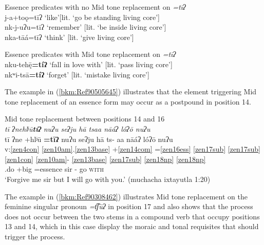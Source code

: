 \documentclass[output=paper]{langscibook}
\begin{document}
\ea\label{bkm:Ref90239685}Essence predicates with no Mid tone replacement on \textit{=tīʔ}\\
j-a+toǫ=tīʔ \hspace{1cm} `like'\hspace{2.2cm}[lit. `go be standing living core']\\
nk-j-uʔu=tīʔ \hspace{0.77cm} `remember'\hspace{1.1cm}  [lit. `be inside living core']\\
nka-tāá=tīʔ \hspace{0.94cm} `think'\hspace{1.84cm}  [lit. `give living core']\\
\z 

\ea\label{bkm:Ref90239700}Essence predicates with Mid tone replacement on \textit{=tīʔ}\\
nku-teh\={ę}\textbf{=tíʔ} \hspace{0.7cm} `fall in love with' \hspace{0.1cm} [lit. `pass living core']\\
nkʷi-tsā\textbf{=tíʔ} \hspace{0.85cm} `forget' \hspace{1.64cm} [lit. `mistake living core']\\
\z 

The example in (\ref{bkm:Ref90505645}) illustrates that the element triggering Mid tone replacement of an essence form may occur as a postpound in position 14. 

\ea\label{bkm:Ref90505645}Mid tone replacement between positions 14 and 16\\
    \textit{tī ʔnehlʲū\textbf{tíʔ} nuʔu seʔju hā tsaa nāáʔ lóʔō nuʔu} \\
    \glll tī ʔne +hlʲū \textbf{=tīʔ} nuʔu seʔju hā ts- aa nāáʔ lóʔō nuʔu\\
    v:\ref{zen4con} \ref{zen10am}.\ref{zen13base} +\ref{zen14com} =\ref{zen16ess} \ref{zen17sub} \ref{zen17sub} \ref{zen1con} \ref{zen10am}{}- \ref{zen13base} \ref{zen17sub} \ref{zen18np} \ref{zen18np} \\ 
    \Cond{} \Pot{}.do +big =essence \Second\Sg{} sir \Conj{} \Pot{}{}- go \First\Sg{} \textsc{with} \Second\Sg{}\\
    \glt `Forgive me sir but I will go with you.' (muchacha ixtayutla 1:20)
\z

The example in (\ref{bkm:Ref90308462}) illustrates Mid tone replacement on the feminine singular pronoun \textit{=t͡ʃūʔ} in position 17 and also shows that the process does not occur between the two stems in a compound verb that occupy positions 13 and 14, which in this case display the moraic and tonal requisites that should trigger the process.
\end{document}
